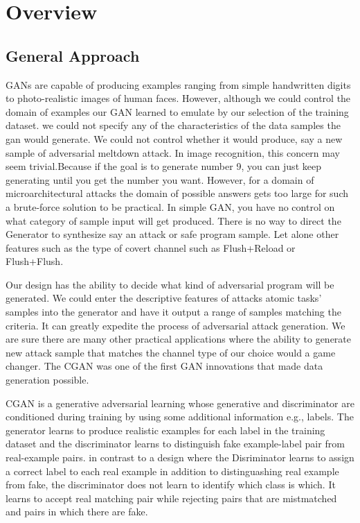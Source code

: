 \section{ Overview}\label{alg}
\subsection{General Approach}
 
 GANs are capable of producing examples ranging from simple handwritten digits to photo-realistic images of human faces. However, although we could control the domain of examples our GAN learned to emulate by our selection of the training dataset. we could not specify any of the characteristics of the data samples the gan would generate. We could not control whether it would produce, say a new sample of adversarial meltdown attack. In image recognition, this concern may seem trivial.Because if the goal is to generate number 9, you can just keep generating until you get the number you want. However, for a domain of microarchitectural attacks the domain of possible answers gets too large for such a brute-force solution to be practical. In simple GAN, you have no control on what category of sample input will get produced. There is no way to direct the Generator to synthesize say an attack or safe program sample. Let alone other features such as the type of covert channel such as Flush+Reload or Flush+Flush.
 
 Our design has the ability to decide what kind of adversarial program will be generated. We could enter the descriptive features of attacks atomic tasks' samples into the generator and have it output a range of samples matching the criteria. It can greatly expedite the process of adversarial attack generation. We are sure there are many other practical applications where the ability to generate new attack sample that matches the channel type of our choice would a game changer. The CGAN was one of the first GAN innovations that made data generation possible. 
 
 CGAN is a generative adversarial learning whose generative and discriminator are conditioned during training by using some additional information e.g., labels. 
 The generator learns to produce realistic examples for each label in the training dataset and the discriminator learns to distinguish fake example-label pair from real-example pairs.   
 in contrast to a design where the Disriminator learns to assign a correct label to each real example in addition to distinguashing real example from fake, the discriminator does not learn to identify which class is which.  It learns to accept real matching pair while rejecting pairs that are mistmatched and pairs in which there are fake. 
 
